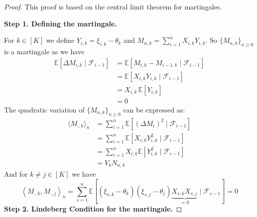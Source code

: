 \jointcltlemma*
\begin{proof}
	This proof is based on the central limit theorem for martingales.
	
	\textbf{Step 1. Defining the martingale.}
	
	For \(k \in [K]\) we define \( Y_{i,k} = \xi_{i,k} - \theta_k \) and \(M_{n,k} = \sum_{i=1}^{n} X_{i,k} Y_{i,k}.\) So \(\{M_{n,k}\}_{n \geq 0}\) is a martingale as we have
	\begin{align*}
		\mathbb{E}[\Delta M_{i,k} \mid \mathcal{F}_{i-1}] 
		&= \mathbb{E}[M_{i,k} - M_{i-1,k} \mid \mathcal{F}_{i-1}]\\
		&= \mathbb{E}[X_{i,k} Y_{i,k} \mid \mathcal{F}_{i-1}]\\
		&= X_{i,k} \, \mathbb{E}[Y_{i,k}]\\
		&= 0
	\end{align*}
	The quadratic variation of \( \{M_{n,k}\}_{n \geq 0} \) can be expressed as:
	\begin{align*}
		\langle M_{.,k} \rangle_n &= \sum_{i=1}^{n} \mathbb{E}\left[ (\Delta M_i)^2 \mid \mathcal{F}_{i-1} \right]\\
		&= \sum_{i=1}^{n} \mathbb{E}\left[ X_{i,k} Y_{i,k}^2 \mid \mathcal{F}_{i-1} \right]\\
		&= \sum_{i=1}^{n} X_{i,k}\mathbb{E}\left[Y_{i,k}^2 \mid \mathcal{F}_{i-1} \right]\\
		&= V_k N_{n,k}
	\end{align*}
	And for \(k \neq j \in [K]\) we have
	\[ \left<M_{.,k}, M_{.,j}\right>_n = \sum_{s=1}^{n} \mathbb{E}\left[\left(\xi_{s,k} - \theta_{k}\right)\left(\xi_{s,j} - \theta_{j}\right)\underbrace{X_{s,k}X_{s,j}}_{= 0}\mid \mathcal{F}_{s-1}\right] = 0\]	
	\textbf{Step 2. Lindeberg Condition for the martingale.}
	

\end{proof}
